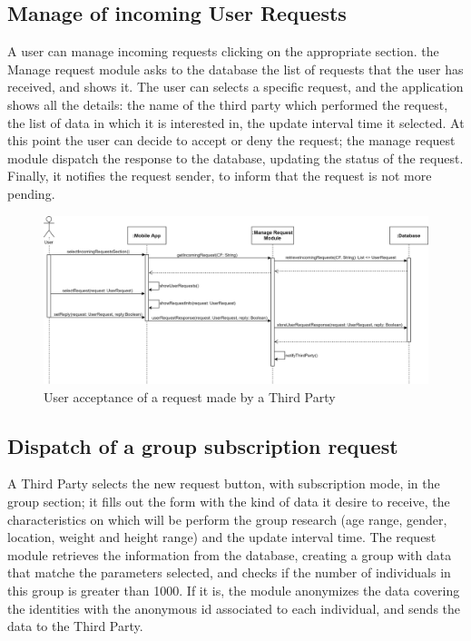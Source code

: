 \subsection{Manage of incoming User Requests}
A user can manage incoming requests clicking on the appropriate section. the Manage request module asks to the database the list of requests that the user has received, and shows it. The user can selects a specific request, and the application shows all the details:
the name of the third party which performed the request, the list of data in which it is interested in, the update interval time it selected. At this point the user can decide to accept or deny the request; the manage request module dispatch the response to the database, updating the status of the request. Finally, it notifies the request sender, to inform that the request is not more pending. 

\begin{figure}[H]
    \centering
    \includegraphics[scale=0.14]{./Pictures/acceptRequest.png}
    \caption{User acceptance of a request made by a Third Party}
\end{figure}

\subsection{Dispatch of a group subscription request }
A Third Party selects the new request button, with subscription mode, in the group section; it fills out the form with the kind of data it desire to receive, the characteristics on which will be perform the group research (age range, gender, location, weight and height range) and the update interval time. The request module retrieves the information from the database, creating a group with data that matche the parameters selected, and checks if the number of individuals in this group is greater than 1000. If it is, the module anonymizes the data covering the identities with the anonymous id associated to each individual, and sends the data to the Third Party.

